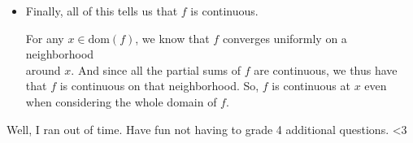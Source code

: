 \documentclass{book}
\newcommand{\pracTwo}{
   \color{Orange}%
   \fontsize{12}{14}\selectfont%
}
\newenvironment{myIndent}{%
   \begin{adjustwidth}{2.5em}{0em}%
}{%
   \end{adjustwidth}%
}
\newcommand{\domain}[1]{\mathrm{dom}(#1)}
\newenvironment{myClosureOne}[2][.]{%
   \color{#1}%
   \begin{tabular}{|p{#2in}|} \hline \\%
}{%
   \\ \hline \end{tabular}%
}
\newcommand{\retTwo}{\hfill\bigbreak}
\begin{document}
\begin{itemize}
{\begin{myIndent}
\begin{myIndent}
{\begin{myIndent}
\begin{myClosureOne}{4}
               So $f$ is not bounded on $(0, r]$.\\ [-6pt]
            \end{myClosureOne}\retTwo
         \end{myIndent}}
      \end{myIndent}

      Similarly for $[-r, 0) \setminus \{\frac{-1}{n^2} \mid n \in \mathbb{N}\}$:
      \begin{myIndent}
         For all $n \in \mathbb{N}$, at $x = \frac{1}{-2n^2}$ we have that $\frac{1}{1 - n^2(\frac{1}{2n^2})} = 2$. Thus for\\ all $n \in \mathbb{N}$, we can pick $x$ such that $\left|\sum\limits_{i=1}^n \frac{1}{1 + xn^2} - \sum\limits_{i=1}^{n-1} \frac{1}{1 + xn^2}\right| > 1$. So,\\ [4pt] the Cauchy Criterion is not fulfilled.\\ [6pt]
      \end{myIndent}
   \end{myIndent}}

   \item Finally, all of this tells us that $f$ is continuous.
   {\begin{myIndent}\pracTwo
      For any $x \in \domain{f}$, we know that $f$ converges uniformly on a neighborhood\\ around $x$. And since all the partial sums of $f$ are continuous, we thus have\\ that $f$ is continuous on that neighborhood. So, $f$ is continuous at $x$ even\\ when considering the whole domain of $f$.\retTwo
   \end{myIndent}}
\end{itemize}

Well, I ran out of time. Have fun not having to grade 4 additional questions. <3
\end{document}
